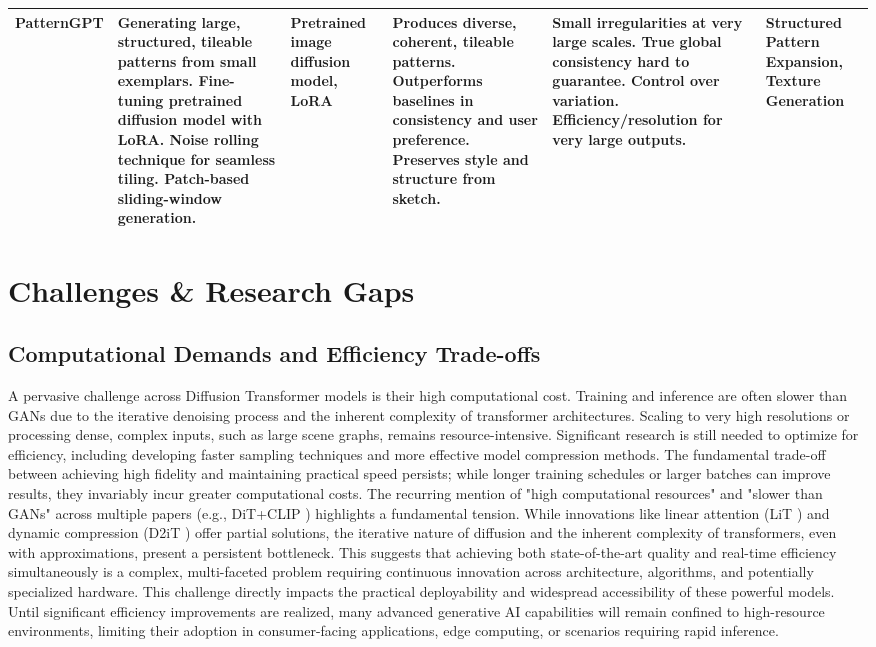 \documentclass[a4paper]{article}
\begin{document}
\begin{table*}[!htbp]
\begin{tabularx}{\textwidth}{@{} >{\RaggedRight}p{1.5cm} >{\RaggedRight}X >{\RaggedRight}p{2cm} >{\RaggedRight}X >{\RaggedRight}X >{\RaggedRight}p{2cm} @{}}
\addlinespace
PatternGPT & Generating large, structured, tileable patterns from small exemplars. Fine-tuning pretrained diffusion model with LoRA. Noise rolling technique for seamless tiling. Patch-based sliding-window generation. & Pretrained image diffusion model, LoRA & Produces diverse, coherent, tileable patterns. Outperforms baselines in consistency and user preference. Preserves style and structure from sketch. & Small irregularities at very large scales. True global consistency hard to guarantee. Control over variation. Efficiency/resolution for very large outputs. & Structured Pattern Expansion, Texture Generation \\
\bottomrule
\end{tabularx}
\end{table*}

\section{Challenges \& Research Gaps}
\subsection{Computational Demands and Efficiency Trade-offs}
A pervasive challenge across Diffusion Transformer models is their high computational cost. Training and inference are often slower than GANs due to the iterative denoising process and the inherent complexity of transformer architectures. Scaling to very high resolutions or processing dense, complex inputs, such as large scene graphs, remains resource-intensive. Significant research is still needed to optimize for efficiency, including developing faster sampling techniques and more effective model compression methods. The fundamental trade-off between achieving high fidelity and maintaining practical speed persists; while longer training schedules or larger batches can improve results, they invariably incur greater computational costs. The recurring mention of "high computational resources" and "slower than GANs" across multiple papers (e.g., DiT+CLIP \cite{Zhu2025ImageToImage}) highlights a fundamental tension. While innovations like linear attention (LiT \cite{Jiang2025LiT}) and dynamic compression (D2iT \cite{Jia2025D2iT}) offer partial solutions, the iterative nature of diffusion and the inherent complexity of transformers, even with approximations, present a persistent bottleneck. This suggests that achieving both state-of-the-art quality and real-time efficiency simultaneously is a complex, multi-faceted problem requiring continuous innovation across architecture, algorithms, and potentially specialized hardware. This challenge directly impacts the practical deployability and widespread accessibility of these powerful models. Until significant efficiency improvements are realized, many advanced generative AI capabilities will remain confined to high-resource environments, limiting their adoption in consumer-facing applications, edge computing, or scenarios requiring rapid inference.
\end{document}
